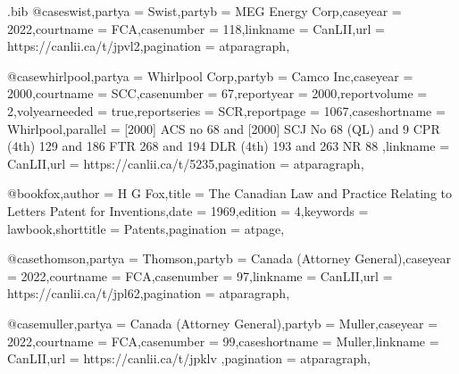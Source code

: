 \begin{filecontents*}[overwrite]{\jobname.bib}
@case{swist,partya = {Swist},partyb = {MEG Energy Corp},caseyear = {2022},courtname = {FCA},casenumber = {118},linkname = {CanLII},url = {https://canlii.ca/t/jpvl2},pagination = {atparagraph},}

@case{whirlpool,partya = {Whirlpool Corp},partyb = {Camco Inc},caseyear = {2000},courtname = {SCC},casenumber = {67},reportyear = {2000},reportvolume = {2},volyearneeded = {true},reportseries = {SCR},reportpage = {1067},caseshortname = {Whirlpool},parallel = { [2000] ACS no 68 and [2000] SCJ No 68 (QL) and 9 CPR (4th) 129 and 186 FTR 268 and 194 DLR (4th) 193 and 263 NR 88 },linkname = {CanLII},url = {https://canlii.ca/t/5235},pagination = {atparagraph},}

@book{fox,author = {H G Fox},title = {The Canadian Law and Practice Relating to Letters Patent for Inventions},date = {1969},edition = {4},keywords = {lawbook},shorttitle = {Patents},pagination = {atpage},}

@case{thomson,partya = {Thomson},partyb = {Canada (Attorney General)},caseyear = {2022},courtname = {FCA},casenumber = {97},linkname = {CanLII},url = {https://canlii.ca/t/jpl62},pagination = {atparagraph},}

@case{muller,partya = {Canada (Attorney General)},partyb = {Muller},caseyear = {2022},courtname = {FCA},casenumber = {99},caseshortname = {Muller},linkname = {CanLII},url = {https://canlii.ca/t/jpklv },pagination = {atparagraph},}








\end{filecontents*}



\documentclass{article}
\newcommand\rulesep{\rule{0.4\textwidth}{.4pt}}

\usepackage[table,dvipsnames,svgnames]{xcolor}
\pagecolor{blue!3}
\usepackage{fontspec}
\setmainfont{Noto Serif}
\setsansfont{TeX Gyre Adventor}[Scale=1.2]%
\setmonofont{Noto Sans Mono}%
\newfontface{}[Colour=blue]
\newcommand\circnum[1]{{\fcircnum#1}}
\usepackage[french,british]{babel}
\usepackage{csquotes}
\usepackage{graphicx}

\usepackage{marginnote}
\usepackage{microtype}
\usepackage{parskip}
\newcommand\defaultparskip{\setlength\parskip{0pt}}
\newcommand\normalparskip{\parskip=.5\baselineskip plus 2pt\relax}

